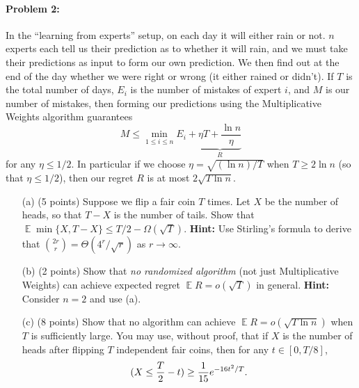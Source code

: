 \documentclass[12pt]{article}
\DeclareMathOperator*{\E}{\mathbb{E}}
\let\Pr\relax
\DeclareMathOperator*{\Pr}{\mathbb{P}}
\begin{document}
\paragraph{Problem 2:} In the ``learning from experts'' setup, on each day it will either rain or not. $n$ experts each tell us their prediction as to whether it will rain, and we must take their predictions as input to form our own prediction. We then find out at the end of the day whether we were right or wrong (it either rained or didn't). If $T$ is the total number of days, $E_i$ is the number of mistakes of expert $i$, and $M$ is our number of mistakes, then forming our predictions using the Multiplicative Weights algorithm guarantees
$$
M \le \min_{1\le i\le n} E_i + \underbrace{\eta T + \frac{\ln n}{\eta}}_R
$$
for any $\eta \le 1/2$. In particular if we choose $\eta = \sqrt{(\ln n)/T}$ when $T \ge 2 \ln n$ (so that $\eta \le 1/2$), then our regret $R$ is at most $2\sqrt{T\ln n}$.
\begin{itemize} 
\item[(a)] (5 points) Suppose we flip a fair coin $T$ times. Let $X$ be the number of heads, so that $T-X$ is the number of tails. Show that $\E \min\{X, T-X\} \le T/2 - \Omega(\sqrt{T})$. \textbf{Hint:} Use Stirling's formula to derive that $\binom{2r}{r} = \Theta(4^r/\sqrt{r})$ as $r\rightarrow\infty$.
\item[(b)] (2 points) Show that {\em no randomized algorithm} (not just Multiplicative Weights) can achieve expected regret $\E R = o(\sqrt{T})$ in general. \textbf{Hint:} Consider $n=2$ and use (a).
\item[(c)] (8 points) Show that no algorithm can achieve $\E R = o(\sqrt{T\ln n})$ when $T$ is sufficiently large. You may use, without proof, that if $X$ is the number of heads after flipping $T$ independent fair coins, then for any $t\in[0,T/8]$,
$$
\Pr(X \le \frac T2 - t) \ge \frac 1{15} e^{-16t^2/T} .
$$
\end{itemize} 
\end{document}
